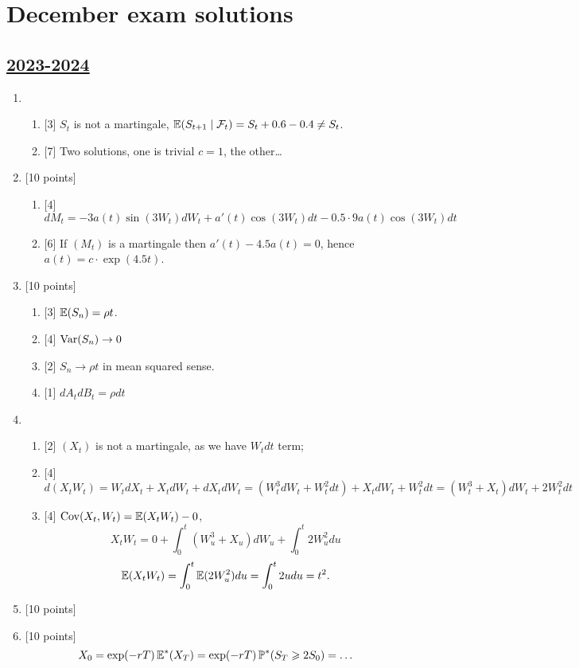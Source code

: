 
\newpage
\thispagestyle{empty}
\section{December exam solutions}
\subsection[2023-2024]{\hyperref[sec:kr_02_2023_2024]{2023-2024}}
\label{sec:sol_kr_02_2023_2024} %

\begin{enumerate}
    \item 
 \begin{enumerate}
    \item {[3]} $S_t$ is not a martingale, $\operatorname{\mathbb{E}}(S_{t+1} \mid \mathcal{F}_t) = S_t + 0.6 - 0.4 \neq S_t$.
    \item {[7]} Two solutions, one is trivial $c=1$, the other\dots 
 \end{enumerate}

\item {[10 points]}

\begin{enumerate}
    \item {[4]} $dM_t = -3a(t)\sin(3W_t)dW_t + a'(t)\cos(3W_t)dt - 0.5 \cdot 9 a(t) \cos(3W_t) dt$ 
    \item {[6]} If $(M_t)$ is a martingale then $a'(t) - 4.5 a(t) = 0$, hence $a(t) = c\cdot \exp(4.5t)$.
\end{enumerate}
 
\item {[10 points]} 
\begin{enumerate}
    \item {[3]} $\operatorname{\mathbb{E}}(S_n) = \rho t$.
    \item {[4]} $\operatorname{Var}(S_n) \to 0$
    \item {[2]} $S_n \to \rho t$ in mean squared sense. 
    \item {[1]} $dA_t dB_t = \rho dt$
\end{enumerate}

\item 
\begin{enumerate}
    \item {[2]} $(X_t)$ is not a martingale, as we have $W_t dt$ term;
    \item {[4]} 
    \[
    d(X_t W_t) = W_t dX_t + X_t dW_t + dX_t dW_t  = (W_t^3 dW_t + W_t^2 dt) + X_t dW_t + W_t^2 dt = (W_t^3 + X_t) dW_t + 2W_t^2 dt
    \]
    \item {[4]} $\operatorname{Cov}(X_t, W_t) = \operatorname{\mathbb{E}}(X_t W_t) - 0$,
    \[
    X_t W_t = 0 + \int_0^t (W_u^3 + X_u) dW_u + \int_0^t 2W_u^2 du
    \]
    \[
    \operatorname{\mathbb{E}}(X_t W_t) =  \int_0^t \operatorname{\mathbb{E}}(2W_u^2) du =  \int_0^t 2u du = t^2.
    \]
\end{enumerate}

\item {[10 points]} 

\item {[10 points]}  
\[
X_0 = \exp(-rT)\operatorname{\mathbb{E}}^*(X_T) = \exp(-rT) \operatorname{\mathbb{P}}^*(S_T \geqslant 2S_0) = \dots
\]

\end{enumerate}


